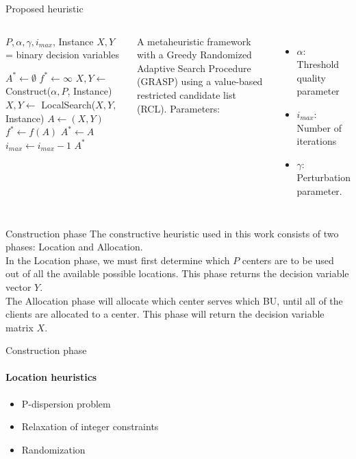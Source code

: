 \documentclass{beamer}
\begin{document}
\begin{frame}{Proposed heuristic}
    \begin{columns}
        \begin{algorithmic}[1]
        
        \REQUIRE $P, \alpha, \gamma, i_{max}$, Instance
        \ENSURE $X,Y$ = binary decision variables
        
        \STATE $A^* \gets \emptyset$
        \STATE $f^* \gets \infty$
            \STATE $X, Y \gets$ Construct($\alpha, P$, Instance)
            \STATE $X, Y \gets$ LocalSearch($X, Y,$ Instance)
            \STATE $A \gets (X, Y)$
                \STATE $f^* \gets f(A)$
                \STATE $A^* \gets A$ 
            \ENDIF
            \STATE $i_{max} \gets i_{max} - 1$
        \ENDWHILE
        \RETURN $A^*$
        
        \end{algorithmic}
        
        A metaheuristic framework with a Greedy Randomized Adaptive Search Procedure (GRASP) using a value-based restricted candidate list (RCL).
        Parameters:
        \begin{itemize}
            \item $\alpha$: Threshold quality parameter
            \item $i_{max}$: Number of iterations
            \item $\gamma$: Perturbation parameter.
        \end{itemize}
    \end{columns}
\end{frame}

\begin{frame}{Construction phase}
    The constructive heuristic used in this work consists of two phases: Location and Allocation. \\
    In the Location phase, we must first determine which $P$ centers are to be used out of all the available possible locations. This phase returns the decision variable vector $Y$. \\
    The Allocation phase will allocate which center serves which BU, until all of the clients are allocated to a center. This phase will return the decision variable matrix $X$. \\
\end{frame}

\begin{frame}{Construction phase}
    \framesubtitle{Location heuristics}
    \begin{itemize}
        \item P-dispersion problem
        \item Relaxation of integer constraints
        \item Randomization
    \end{itemize}
\end{frame}
\end{document}

